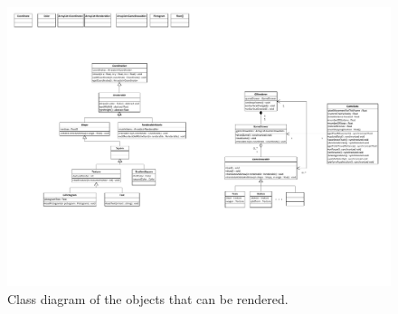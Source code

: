\begin{figure}[H]
\centering
\includegraphics[page=2,width=1\linewidth]{img/opengl.pdf}
\caption{Class diagram of the objects that can be rendered.}
\label{fig:renderables}
\end{figure}

